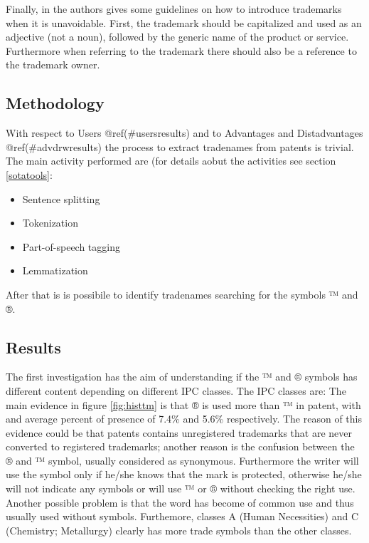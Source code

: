 \documentclass[]{book}
\providecommand{\tightlist}{%
  \setlength{\itemsep}{0pt}\setlength{\parskip}{0pt}}
\begin{document}
Finally, in \citep{pressman2018nolo} the authors gives some guidelines
on how to introduce trademarks when it is unavoidable. First, the
trademark should be capitalized and used as an adjective (not a noun),
followed by the generic name of the product or service. Furthermore when
referring to the trademark there should also be a reference to the
trademark owner.

\subsection{Methodology}\label{methodology-1}

With respect to Users @ref(\#usersresults) and to Advantages and
Distadvantages @ref(\#advdrwresults) the process to extract tradenames
from patents is trivial. The main activity performed are (for details
aobut the activities see section \ref{sotatools}:

\begin{itemize}
\tightlist
\item
  Sentence splitting
\item
  Tokenization
\item
  Part-of-speech tagging
\item
  Lemmatization
\end{itemize}

After that is is possibile to identify tradenames searching for the
symbols ™ and ®.

\subsection{Results}\label{results-2}

The first investigation has the aim of understanding if the ™ and ®
symbols has different content depending on different IPC \citep{wipo1}
classes. The IPC classes are: The main evidence in figure
\ref{fig:histtm} is that ® is used more than ™ in patent, with and
average percent of presence of 7.4\% and 5.6\% respectively. The reason
of this evidence could be that patents contains unregistered trademarks
that are never converted to registered trademarks; another reason is the
confusion between the ® and ™ symbol, usually considered as synonymous.
Furthermore the writer will use the symbol only if he/she knows that the
mark is protected, otherwise he/she will not indicate any symbols or
will use ™ or ® without checking the right use. Another possible problem
is that the word has become of common use and thus usually used without
symbols. Furthemore, classes A (Human Necessities) and C (Chemistry;
Metallurgy) clearly has more trade symbols than the other classes.
\end{document}
